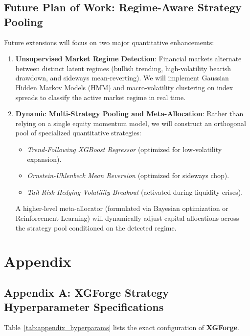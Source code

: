 \subsection{Future Plan of Work: Regime-Aware Strategy Pooling}
Future extensions will focus on two major quantitative enhancements:
\begin{enumerate}
    \item \textbf{Unsupervised Market Regime Detection}: Financial markets alternate between distinct latent regimes (bullish trending, high-volatility bearish drawdown, and sideways mean-reverting). We will implement Gaussian Hidden Markov Models (HMM) and macro-volatility clustering on index spreads to classify the active market regime in real time.
    \item \textbf{Dynamic Multi-Strategy Pooling and Meta-Allocation}: Rather than relying on a single equity momentum model, we will construct an orthogonal pool of specialized quantitative strategies:
    \begin{itemize}
        \item \emph{Trend-Following XGBoost Regressor} (optimized for low-volatility expansion).
        \item \emph{Ornstein-Uhlenbeck Mean Reversion} (optimized for sideways chop).
        \item \emph{Tail-Risk Hedging Volatility Breakout} (activated during liquidity crises).
    \end{itemize}
    A higher-level meta-allocator (formulated via Bayesian optimization or Reinforcement Learning) will dynamically adjust capital allocations across the strategy pool conditioned on the detected regime.
\end{enumerate}


\section*{Appendix}

\subsection*{Appendix A: XGForge Strategy Hyperparameter Specifications}
Table~\ref{tab:appendix_hyperparams} lists the exact configuration of \textbf{XGForge}.

